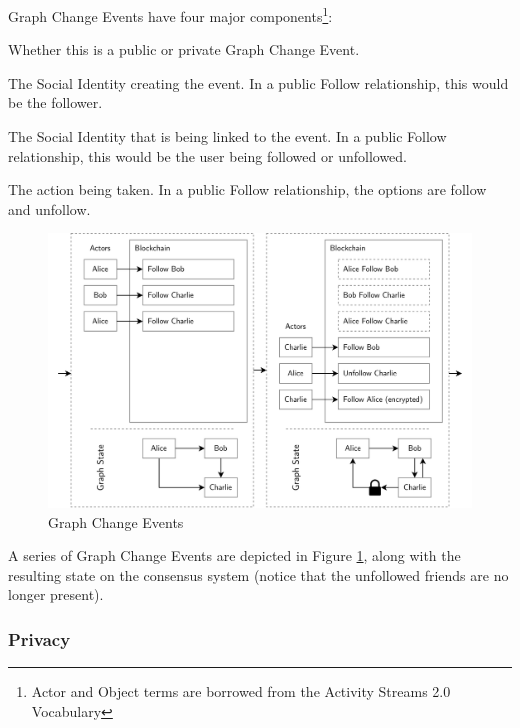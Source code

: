 \documentclass[12pt,letterpaper]{article}
\providecommand{\tightlist}{%
\setlength{\itemsep}{0pt}\setlength{\parskip}{0pt}}
\begin{document}
\begin{samepage}
	Graph Change Events have four major components\footnote{Actor and Object terms are borrowed from the Activity Streams 2.0 Vocabulary\cite{activitypub}}:

	\begin{description}
		\tightlist
		\item[Type:]
		      Whether this is a public or private Graph Change Event.
		\item[Actor:]
		      The Social Identity creating the event. In a public Follow relationship, this would be the follower.
		\item[Object:]
		      The Social Identity that is being linked to the event. In a public Follow relationship, this would be the user being followed or unfollowed.
		\item[Action:]
		      The action being taken. In a public Follow relationship, the options are follow and unfollow.
	\end{description}
\end{samepage}

\begin{figure}
	\includegraphics[width=\linewidth]{figures/Graph Change Events.png}
	\caption{Graph Change Events}
	\label{fig:3}
\end{figure}

A series of Graph Change Events are depicted in Figure \ref{fig:3}, along with the
resulting state on the consensus system (notice that the unfollowed friends are no longer
present).

\subsubsection{Privacy}
\end{document}

